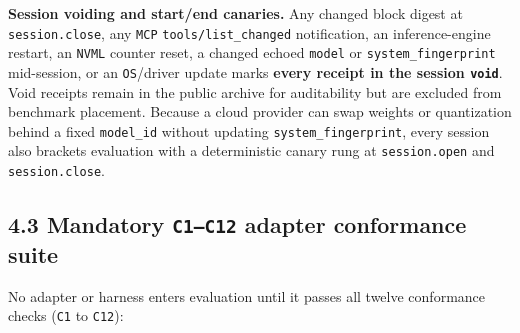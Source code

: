 \documentclass[10pt,letterpaper]{article}
\begin{document}
\textbf{Session voiding and start/end canaries.} Any changed block
digest at \texttt{session.\allowbreak{}close}, any \texttt{MCP}
\texttt{tools/\allowbreak{}list\_\allowbreak{}changed} notification, an inference-engine restart,
an \texttt{NVML} counter reset, a changed echoed \texttt{model} or
\texttt{system\_\allowbreak{}fingerprint} mid-session, or an \texttt{OS}/\allowbreak{}driver
update marks \textbf{every receipt in the session \texttt{void}}. Void
receipts remain in the public archive for auditability but are excluded
from benchmark placement. Because a cloud provider can swap weights or
quantization behind a fixed \texttt{model\_id} without updating
\texttt{system\_\allowbreak{}fingerprint}, every session also brackets evaluation
with a deterministic canary rung at \texttt{session.\allowbreak{}open} and
\texttt{session.\allowbreak{}close}.

\subsection{\texorpdfstring{4.3 Mandatory \texttt{C1–C12} adapter
conformance
suite}{4.3 Mandatory C1--C12 adapter conformance suite}}\label{mandatory-c1c12-adapter-conformance-suite}

No adapter or harness enters evaluation until it passes all twelve
conformance checks (\texttt{C1} to \texttt{C12}):
\end{document}
